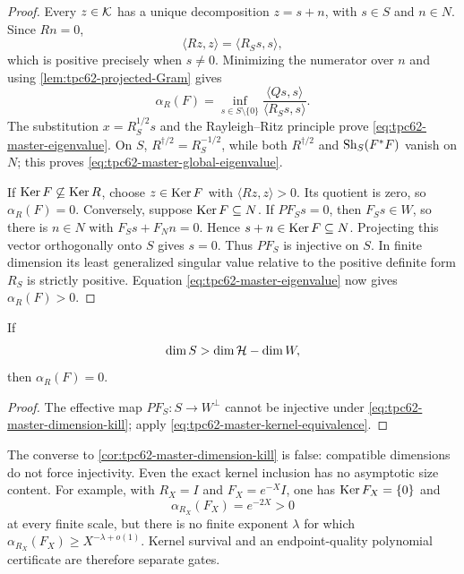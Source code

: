 \begin{proof}
Every \(z\in\mathcal K\) has a unique decomposition \(z=s+n\), with
\(s\in S\) and \(n\in N\).  Since \(Rn=0\),
\[
 \langle Rz,z\rangle=\langle R_Ss,s\rangle,
\]
which is positive precisely when \(s\ne0\).  Minimizing the numerator over
\(n\) and using \cref{lem:tpc62-projected-Gram} gives
\begin{equation}
 \alpha_R(F)
 =\inf_{s\in S\setminus\{0\}}
 \frac{\langle Qs,s\rangle}{\langle R_Ss,s\rangle}.
 \label{eq:tpc62-master-Rayleigh-quotient}
\end{equation}
The substitution \(x=R_S^{1/2}s\) and the Rayleigh--Ritz principle prove
\eqref{eq:tpc62-master-eigenvalue}.  On \(S\),
\(R^{\dagger/2}=R_S^{-1/2}\), while both
\(R^{\dagger/2}\) and \(\operatorname{Sh}_S(F^*F)\) vanish on \(N\); this proves
\eqref{eq:tpc62-master-global-eigenvalue}.

If \(\operatorname{Ker} F\not\subseteq\operatorname{Ker} R\), choose \(z\in\operatorname{Ker} F\) with
\(\langle Rz,z\rangle>0\).  Its quotient is zero, so
\(\alpha_R(F)=0\).  Conversely, suppose
\(\operatorname{Ker} F\subseteq N\).  If \(PF_Ss=0\), then
\(F_Ss\in W\), so there is \(n\in N\) with
\(F_Ss+F_Nn=0\).  Hence \(s+n\in\operatorname{Ker} F\subseteq N\).  Projecting this
vector orthogonally onto \(S\) gives \(s=0\).  Thus \(PF_S\) is
injective on \(S\).  In finite dimension its least generalized singular
value relative to the positive definite form \(R_S\) is strictly
positive.  Equation \eqref{eq:tpc62-master-eigenvalue} now gives
\(\alpha_R(F)>0\).
\end{proof}

\begin{corollary}
\label{cor:tpc62-master-dimension-kill}
If
\begin{equation}
 \dim S>\dim\mathcal H-\dim W,
 \label{eq:tpc62-master-dimension-kill}
\end{equation}
then \(\alpha_R(F)=0\).
\end{corollary}

\begin{proof}
The effective map \(PF_S:S\to W^\perp\) cannot be injective under
\eqref{eq:tpc62-master-dimension-kill}; apply
\eqref{eq:tpc62-master-kernel-equivalence}.
\end{proof}

The converse to \cref{cor:tpc62-master-dimension-kill} is false: compatible
dimensions do not force injectivity.  Even the exact kernel inclusion has
no asymptotic size content.  For example, with \(R_X=I\) and
\(F_X=e^{-X}I\), one has \(\operatorname{Ker} F_X=\{0\}\) and
\begin{equation}
 \alpha_{R_X}(F_X)=e^{-2X}>0
 \label{eq:tpc62-positive-superpolynomial-small}
\end{equation}
at every finite scale, but there is no finite exponent \(\lambda\) for
which \(\alpha_{R_X}(F_X)\ge X^{-\lambda+o(1)}\).  Kernel survival and an
endpoint-quality polynomial certificate are therefore separate gates.

